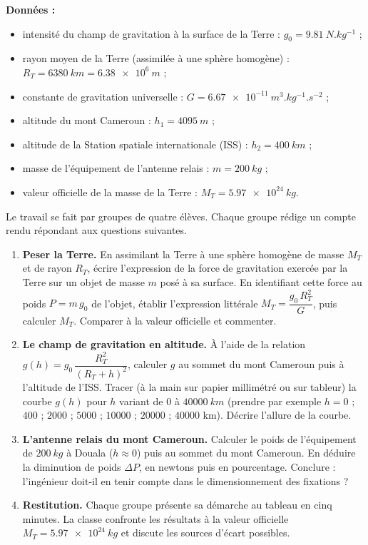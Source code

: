 \documentclass[11pt]{article}
\newcounter{popsec}
\newcounter{popsub}
\newcommand{\courssub}[1]{%
  \stepcounter{popsub}%
  \par\vspace{9pt}\noindent{\popxbold\fontsize{11.5}{13}\selectfont\color{popink}{\color{poporange}\thepopsec.\thepopsub}\hspace{6pt}#1}\par\nopagebreak\vspace{4pt}
}
\begin{document}
\textbf{Données :}
\begin{itemize}
\item intensité du champ de gravitation à la surface de la Terre : $g_0 = \SI{9,81}{N.kg^{-1}}$ ;
\item rayon moyen de la Terre (assimilée à une sphère homogène) : $R_T = \SI{6380}{km} = \SI{6,38e6}{m}$ ;
\item constante de gravitation universelle : $G = \SI{6,67e-11}{m^3.kg^{-1}.s^{-2}}$ ;
\item altitude du mont Cameroun : $h_1 = \SI{4095}{m}$ ;
\item altitude de la Station spatiale internationale (ISS) : $h_2 = \SI{400}{km}$ ;
\item masse de l'équipement de l'antenne relais : $m = \SI{200}{kg}$ ;
\item valeur officielle de la masse de la Terre : $M_T = \SI{5,97e24}{kg}$.
\end{itemize}

\courssub{Consignes}

Le travail se fait par groupes de quatre élèves. Chaque groupe rédige un compte rendu répondant aux questions suivantes.

\begin{enumerate}
\item \textbf{Peser la Terre.} En assimilant la Terre à une sphère homogène de masse $M_T$ et de rayon $R_T$, écrire l'expression de la force de gravitation exercée par la Terre sur un objet de masse $m$ posé à sa surface. En identifiant cette force au poids $P = m\,g_0$ de l'objet, établir l'expression littérale $M_T = \dfrac{g_0\,R_T^2}{G}$, puis calculer $M_T$. Comparer à la valeur officielle et commenter.
\item \textbf{Le champ de gravitation en altitude.} À l'aide de la relation $g(h) = g_0\,\dfrac{R_T^2}{(R_T+h)^2}$, calculer $g$ au sommet du mont Cameroun puis à l'altitude de l'ISS. Tracer (à la main sur papier millimétré ou sur tableur) la courbe $g(h)$ pour $h$ variant de $0$ à $\SI{40000}{km}$ (prendre par exemple $h = 0$ ; $400$ ; $2000$ ; $5000$ ; $10000$ ; $20000$ ; $40000$ km). Décrire l'allure de la courbe.
\item \textbf{L'antenne relais du mont Cameroun.} Calculer le poids de l'équipement de $\SI{200}{kg}$ à Douala ($h \approx 0$) puis au sommet du mont Cameroun. En déduire la diminution de poids $\Delta P$, en newtons puis en pourcentage. Conclure : l'ingénieur doit-il en tenir compte dans le dimensionnement des fixations ?
\item \textbf{Restitution.} Chaque groupe présente sa démarche au tableau en cinq minutes. La classe confronte les résultats à la valeur officielle $M_T = \SI{5,97e24}{kg}$ et discute les sources d'écart possibles.
\end{enumerate}
\end{document}
